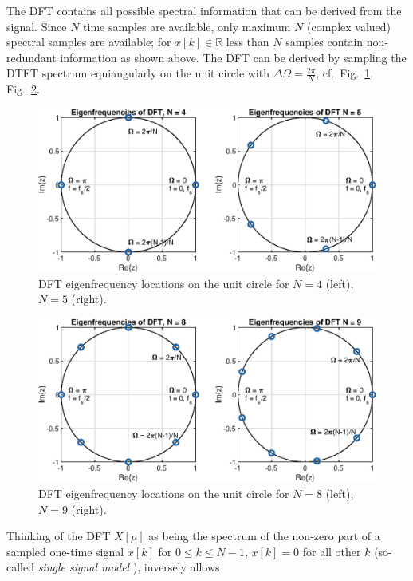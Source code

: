 \documentclass[11pt,a4paper,DIV=12]{scrartcl}
\begin{document}
The DFT contains all possible spectral information that can be derived from the
signal.
%
Since $N$ time samples are available, only maximum $N$ (complex valued) spectral
samples are available; for $x[k]\in\mathbb{R}$ less than $N$ samples contain
non-redundant information as shown above.
%
The DFT can be derived by sampling the DTFT spectrum equiangularly on the unit
circle with $\Delta\Omega=\frac{2\pi}{N}$,
cf.~Fig.~\ref{DFT_Eigenfrequenzen_N4_N5}, Fig.~\ref{DFT_Eigenfrequenzen_N8_N9}.
%
\begin{figure}
		\centering
		\includegraphics[]{graphics/DFT_Eigenfrequenzen_N4_N5}
		\caption{DFT eigenfrequency locations on the unit circle for $N=4$ (left),
		$N=5$ (right).}
		\label{DFT_Eigenfrequenzen_N4_N5}
\end{figure}
\begin{figure}
		\centering
		\includegraphics[]{graphics/DFT_Eigenfrequenzen_N8_N9}
		\caption{DFT eigenfrequency locations on the unit circle for $N=8$ (left),
		$N=9$ (right).}
		\label{DFT_Eigenfrequenzen_N8_N9}
\end{figure}
%
Thinking of the DFT $X[\mu]$ as being the spectrum of the non-zero part of a
sampled one-time signal $x[k]$ for $0\leq k\leq N-1$, $x[k]=0$ for all other
$k$ (so-called \textit{single signal model} \cite{Moeser2011}), inversely allows
\end{document}
